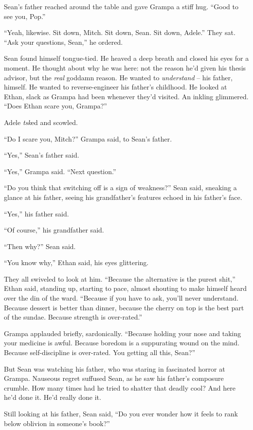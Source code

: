 Sean's father reached around the table and gave Grampa a stiff hug. 
“Good to see you, Pop.”

“Yeah, likewise. Sit down, Mitch. Sit down, Sean. Sit down, Adele.” 
They sat. “Ask your questions, Sean,” he ordered.

Sean found himself tongue-tied. He heaved a deep breath and closed his 
eyes for a moment. He thought about why he was here: not the reason 
he'd given his thesis advisor, but the \emph{real} goddamn reason. He 
wanted to \emph{understand} -- his father, himself. He wanted to 
reverse-engineer his father's childhood. He looked at Ethan, slack as 
Grampa had been whenever they'd visited. An inkling glimmered. “Does 
Ethan scare you, Grampa?”

Adele \emph{tsk}ed and scowled.

“Do I scare you, Mitch?” Grampa said, to Sean's father.

“Yes,” Sean's father said.

“Yes,” Grampa said. “Next question.”

“Do you think that switching off is a sign of weakness?” Sean said, 
sneaking a glance at his father, seeing his grandfather's features 
echoed in his father's face.

“Yes,” his father said.

“Of course,” his grandfather said.

“Then why?” Sean said.

“You know why,” Ethan said, his eyes glittering.

They all swiveled to look at him. “Because the alternative is the 
purest shit,” Ethan said, standing up, starting to pace, almost 
shouting to make himself heard over the din of the ward. “Because if 
you have to ask, you'll never understand. Because dessert is better 
than dinner, because the cherry on top is the best part of the sundae. 
Because strength is over-rated.”

Grampa applauded briefly, sardonically. “Because holding your nose 
and taking your medicine is awful. Because boredom is a suppurating 
wound on the mind. Because self-discipline is over-rated. You getting 
all this, Sean?”

But Sean was watching his father, who was staring in fascinated horror 
at Grampa. Nauseous regret suffused Sean, as he saw his father's 
composure crumble. How many times had he tried to shatter that deadly 
cool? And here he'd done it. He'd really done it.

Still looking at his father, Sean said, “Do you ever wonder how it 
feels to rank below oblivion in someone's book?”

